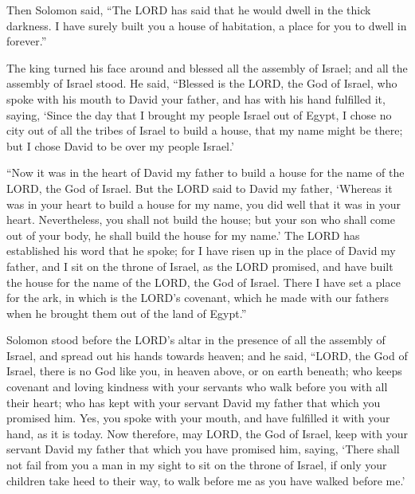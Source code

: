  Then Solomon said, ``The LORD has said that he would dwell
in the thick darkness.  I have surely built you a house of
habitation, a place for you to dwell in forever.''

 The king turned his face around and blessed all the
assembly of Israel; and all the assembly of Israel stood. 
He said, ``Blessed is the LORD, the God of Israel, who spoke with his
mouth to David your father, and has with his hand fulfilled it, saying,
 `Since the day that I brought my people Israel out of
Egypt, I chose no city out of all the tribes of Israel to build a house,
that my name might be there; but I chose David to be over my people
Israel.'

 ``Now it was in the heart of David my father to build a
house for the name of the LORD, the God of Israel.  But the
LORD said to David my father, `Whereas it was in your heart to build a
house for my name, you did well that it was in your heart. 
Nevertheless, you shall not build the house; but your son who shall come
out of your body, he shall build the house for my name.' 
The LORD has established his word that he spoke; for I have risen up in
the place of David my father, and I sit on the throne of Israel, as the
LORD promised, and have built the house for the name of the LORD, the
God of Israel.  There I have set a place for the ark, in
which is the LORD's covenant, which he made with our fathers when he
brought them out of the land of Egypt.''

 Solomon stood before the LORD's altar in the presence of
all the assembly of Israel, and spread out his hands towards heaven;
 and he said, ``LORD, the God of Israel, there is no God
like you, in heaven above, or on earth beneath; who keeps covenant and
loving kindness with your servants who walk before you with all their
heart;  who has kept with your servant David my father that
which you promised him. Yes, you spoke with your mouth, and have
fulfilled it with your hand, as it is today.  Now
therefore, may LORD, the God of Israel, keep with your servant David my
father that which you have promised him, saying, `There shall not fail
from you a man in my sight to sit on the throne of Israel, if only your
children take heed to their way, to walk before me as you have walked
before me.'

